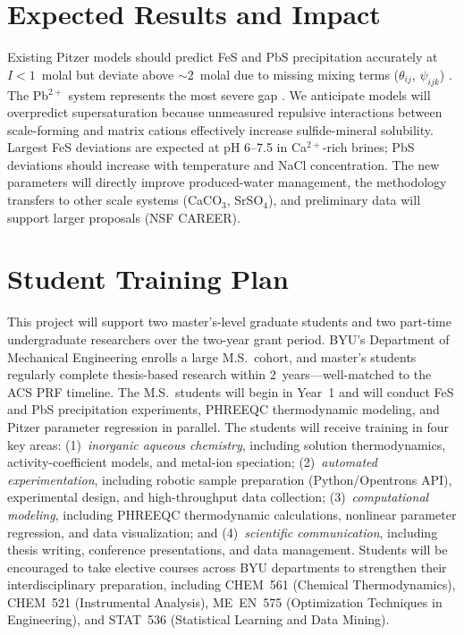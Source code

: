 \documentclass[12pt]{article}
\begin{document}
\section{Expected Results and Impact}

Existing Pitzer models should predict FeS and PbS precipitation accurately at $I < 1$~molal but deviate above $\sim$2~molal due to missing mixing terms ($\theta_{ij}$, $\psi_{ijk}$) \cite{kan2019}. The Pb$^{2+}$ system represents the most severe gap \cite{felmy2000}. We anticipate models will overpredict supersaturation because unmeasured repulsive interactions between scale-forming and matrix cations effectively increase sulfide-mineral solubility. Largest FeS deviations are expected at pH 6--7.5 in Ca$^{2+}$-rich brines; PbS deviations should increase with temperature and NaCl concentration. The new parameters will directly improve produced-water management, the methodology transfers to other scale systems (CaCO$_3$, SrSO$_4$), and preliminary data will support larger proposals (NSF CAREER).

\section{Student Training Plan}

This project will support two master's-level graduate students and two part-time undergraduate researchers over the two-year grant period. BYU's Department of Mechanical Engineering enrolls a large M.S.\ cohort, and master's students regularly complete thesis-based research within 2~years---well-matched to the ACS PRF timeline. The M.S.\ students will begin in Year~1 and will conduct FeS and PbS precipitation experiments, PHREEQC thermodynamic modeling, and Pitzer parameter regression in parallel. The students will receive training in four key areas: (1)~\textit{inorganic aqueous chemistry}, including solution thermodynamics, activity-coefficient models, and metal-ion speciation; (2)~\textit{automated experimentation}, including robotic sample preparation (Python/Opentrons API), experimental design, and high-throughput data collection; (3)~\textit{computational modeling}, including PHREEQC thermodynamic calculations, nonlinear parameter regression, and data visualization; and (4)~\textit{scientific communication}, including thesis writing, conference presentations, and data management. Students will be encouraged to take elective courses across BYU departments to strengthen their interdisciplinary preparation, including CHEM~561 (Chemical Thermodynamics), CHEM~521 (Instrumental Analysis), ME~EN~575 (Optimization Techniques in Engineering), and STAT~536 (Statistical Learning and Data Mining).
\end{document}
